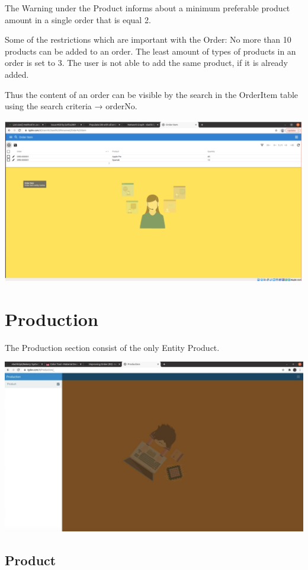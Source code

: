The Warning under the Product informs about a minimum preferable product amount in a single order that is equal 2. 

Some of the restrictions which are important with the Order:
No more than 10 products can be added to an order. The least amount of types of products in an order is set to 3. The user is not able to add the same product, if it is already added.

Thus the content of an order can be visible by the search in the OrderItem table using the search criteria → orderNo.

\includegraphics[width=\textwidth]{sections/01-chapter/images/orderitem5.png}


\section{Production}

The Production section consist of the only Entity Product.

\includegraphics[width=\textwidth]{sections/01-chapter/images/production.png}

\subsection{Product}

